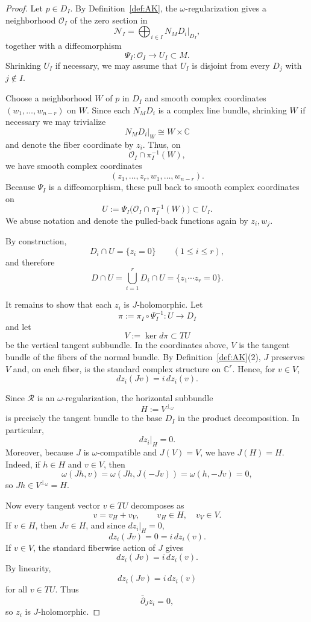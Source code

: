 \documentclass[11pt]{article}
\theoremstyle{remark}
\begin{document}
\begin{proof}
Let $p\in D_I$. By Definition~\ref{def:AK}, the $\omega$-regularization gives a neighborhood $\mathcal O_I$ of the zero section in
\[
\mathcal N_I=\bigoplus_{i\in I}N_MD_i\big|_{D_I},
\]
together with a diffeomorphism
\[
\Psi_I:\mathcal O_I\to U_I\subset M.
\]
Shrinking $U_I$ if necessary, we may assume that $U_I$ is disjoint from every $D_j$ with $j\notin I$.

Choose a neighborhood $W$ of $p$ in $D_I$ and smooth complex coordinates $(w_1,\dots,w_{n-r})$ on $W$. Since each $N_MD_i$ is a complex line bundle, shrinking $W$ if necessary we may trivialize
\[
N_MD_i\big|_W\cong W\times\mathbb C
\]
and denote the fiber coordinate by $z_i$. Thus, on
\[
\mathcal O_I\cap \pi_I^{-1}(W),
\]
we have smooth complex coordinates
\[
(z_1,\dots,z_r,w_1,\dots,w_{n-r}).
\]
Because $\Psi_I$ is a diffeomorphism, these pull back to smooth complex coordinates on
\[
U:=\Psi_I\bigl(\mathcal O_I\cap\pi_I^{-1}(W)\bigr)\subset U_I.
\]
We abuse notation and denote the pulled-back functions again by $z_i,w_j$.

By construction,
\[
D_i\cap U=\{z_i=0\}\qquad (1\le i\le r),
\]
and therefore
\[
D\cap U=\bigcup_{i=1}^r D_i\cap U=\{z_1\cdots z_r=0\}.
\]

It remains to show that each $z_i$ is $J$-holomorphic. Let
\[
\pi:=\pi_I\circ\Psi_I^{-1}:U\to D_I
\]
and let
\[
V:=\ker d\pi\subset TU
\]
be the vertical tangent subbundle. In the coordinates above, $V$ is the tangent bundle of the fibers of the normal bundle. By Definition~\ref{def:AK}(2), $J$ preserves $V$ and, on each fiber, is the standard complex structure on $\mathbb C^r$. Hence, for $v\in V$,
\[
dz_i(Jv)=i\,dz_i(v).
\]

Since $\mathcal R$ is an $\omega$-regularization, the horizontal subbundle
\[
H:=V^{\perp_\omega}
\]
is precisely the tangent bundle to the base $D_I$ in the product decomposition. In particular,
\[
dz_i\big|_H=0.
\]
Moreover, because $J$ is $\omega$-compatible and $J(V)=V$, we have $J(H)=H$. Indeed, if $h\in H$ and $v\in V$, then
\[
\omega(Jh,v)=\omega(Jh,J(-Jv))=\omega(h,-Jv)=0,
\]
so $Jh\in V^{\perp_\omega}=H$.

Now every tangent vector $v\in TU$ decomposes as
\[
v=v_H+v_V,\qquad v_H\in H,\quad v_V\in V.
\]
If $v\in H$, then $Jv\in H$, and since $dz_i|_H=0$,
\[
dz_i(Jv)=0=i\,dz_i(v).
\]
If $v\in V$, the standard fiberwise action of $J$ gives
\[
dz_i(Jv)=i\,dz_i(v).
\]
By linearity,
\[
dz_i(Jv)=i\,dz_i(v)
\]
for all $v\in TU$. Thus
\[
\bar\partial_J z_i=0,
\]
so $z_i$ is $J$-holomorphic.
\end{proof}
\end{document}
